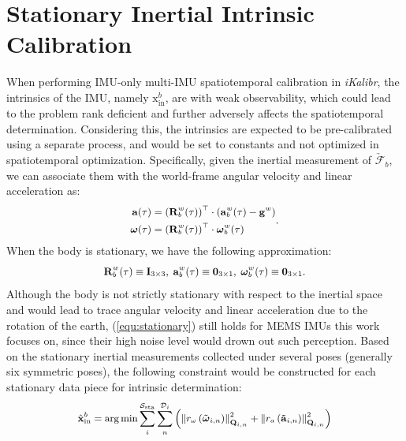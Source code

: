 \documentclass[lettersize,journal,twoside]{IEEEtran}
\newcommand\bsm[1]{\boldsymbol{\mathrm{#1}}}
\newcommand\rotation[2]{{\bsm{R}_{#1}^{#2}}}
\newcommand\angvel[2]{{\bsm{\omega}_{#1}^{#2}}}
\newcommand\linacce[2]{{\bsm{a}_{#1}^{#2}}}
\newcommand\gravity[1]{{\bsm{g}^{#1}}}
\newcommand\coordframe[1]{\underrightarrow{\mathcal{F}}_{#1}}
\begin{document}
\section*{Stationary Inertial Intrinsic Calibration}
\label{sect:app_inertial_intri_calib}
When performing IMU-only multi-IMU spatiotemporal calibration in \emph{iKalibr}, the intrinsics of the IMU, namely $\bsm{x}_{\mathrm{in}}^b$, are with weak observability, which could lead to the problem rank deficient and further adversely affects the spatiotemporal determination.
Considering this, the intrinsics are expected to be pre-calibrated using a separate process, and would be set to constants and not optimized in spatiotemporal optimization.
Specifically, given the inertial measurement of $\coordframe{b}$, we can associate them with the world-frame angular velocity and linear acceleration as:
\begin{equation}
\small
\begin{aligned}
\bsm{a}(\tau)&=\left(\rotation{b}{w}(\tau) \right) ^\top\cdot\left(\linacce{b}{w}(\tau)-\gravity{w}\right) 
\\
\bsm{\omega}(\tau)&=\left(\rotation{b}{w}(\tau) \right) ^\top\cdot\angvel{b}{w}(\tau)
\end{aligned}.
\end{equation}
When the body is stationary, we have the following approximation:
\begin{equation}
\small
\label{equ:stationary}
\rotation{b}{w}(\tau)\equiv\bsm{I}_{3\times 3},\;
\linacce{b}{w}(\tau)\equiv\bsm{0}_{3\times 1},\;
\angvel{b}{w}(\tau)\equiv\bsm{0}_{3\times 1}.
\end{equation}
Although the body is not strictly stationary with respect to the inertial space and would lead to trace angular velocity and linear acceleration due to the rotation of the earth, (\ref{equ:stationary}) still holds for MEMS IMUs this work focuses on, since their high noise level would drown out such perception.
Based on the stationary inertial measurements collected under several poses (generally six symmetric poses), the following constraint would be constructed for each stationary data piece for intrinsic determination:
\begin{equation}
\small
\label{equ:intri_calib}
\hat{\bsm{x}}_{\mathrm{in}}^b
=\arg\min
\sum_{i}^{\mathcal{S}_{\mathrm{sta}}}\sum_{n}^{\mathcal{D}_{i}}
\left( \left\| 
r_{\omega}\left( \tilde{\bsm{\omega}}_{i,n}\right) 
\right\| ^2_{\bsm{Q}_{i,n}}
+
\left\| 
r_{a}\left( \tilde{\bsm{a}}_{i,n}\right) 
\right\| ^2_{\bsm{Q}_{i,n}}\right) 
\end{equation}
\end{document}
